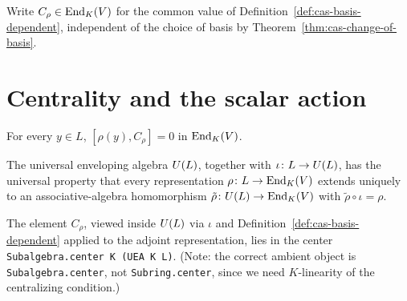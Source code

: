 \begin{definition}
  \label{def:cas-casimir}
  \leanok
  Write $C_\rho \in \operatorname{End}_K(V)$ for the common value of
  Definition~\ref{def:cas-basis-dependent}, independent of the choice of
  basis by Theorem~\ref{thm:cas-change-of-basis}.
\end{definition}

\section{Centrality and the scalar action}
\label{sec:cas-centrality}

\begin{theorem}
  \label{thm:cas-commutes-generators}
  \leanok
  For every $y \in L$, $[\rho(y), C_\rho] = 0$ in $\operatorname{End}_K(V)$.
\end{theorem}

\begin{definition}
  \label{def:cas-uea-rep}
  \mathlibok
  The universal enveloping algebra $U(L)$, together with
  $\iota \colon L \to U(L)$, has the universal property that every
  representation $\rho \colon L \to \operatorname{End}_K(V)$ extends uniquely to an
  associative-algebra homomorphism $\tilde\rho \colon U(L) \to \operatorname{End}_K(V)$
  with $\tilde\rho \circ \iota = \rho$.
\end{definition}

\begin{theorem}
  \label{thm:cas-central}
  \leanok
  The element $C_\rho$, viewed inside $U(L)$ via $\iota$ and
  Definition~\ref{def:cas-basis-dependent} applied to the adjoint
  representation, lies in the center \texttt{Subalgebra.center K (UEA K L)}.
  (Note: the correct ambient object is \texttt{Subalgebra.center}, not
  \texttt{Subring.center}, since we need $K$-linearity of the centralizing
  condition.)
\end{theorem}

